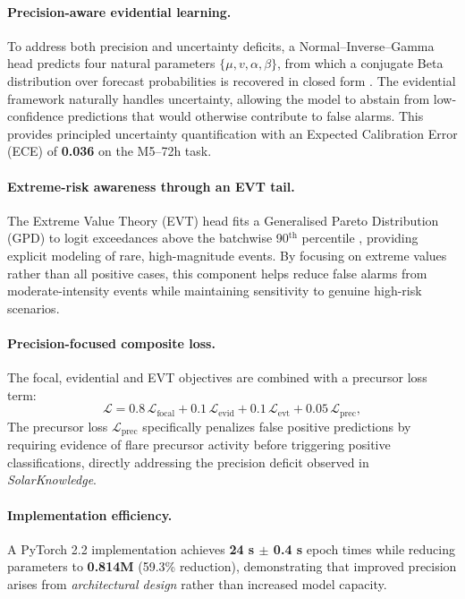 \paragraph{Precision-aware evidential learning.}
To address both precision and uncertainty deficits, a Normal–Inverse–Gamma head predicts four natural parameters $\{\mu,v,\alpha,\beta\}$, from which a conjugate Beta distribution over forecast probabilities is recovered in closed form \citep{sensoy2018evidential}. The evidential framework naturally handles uncertainty, allowing the model to abstain from low-confidence predictions that would otherwise contribute to false alarms. This provides principled uncertainty quantification with an Expected Calibration Error (ECE) of \textbf{0.036} on the M5–72h task.

\paragraph{Extreme-risk awareness through an EVT tail.}
The Extreme Value Theory (EVT) head fits a Generalised Pareto Distribution (GPD) to logit exceedances above the batchwise 90$^{\mathrm{th}}$ percentile \citep{coles2001extremes}, providing explicit modeling of rare, high-magnitude events. By focusing on extreme values rather than all positive cases, this component helps reduce false alarms from moderate-intensity events while maintaining sensitivity to genuine high-risk scenarios.

\paragraph{Precision-focused composite loss.}
The focal, evidential and EVT objectives are combined with a precursor loss term:
\[
  \mathcal{L}=0.8\,\mathcal{L}_{\text{focal}}
             +0.1\,\mathcal{L}_{\text{evid}}
             +0.1\,\mathcal{L}_{\text{evt}}
             +0.05\,\mathcal{L}_{\text{prec}},
\]
The precursor loss $\mathcal{L}_{\text{prec}}$ specifically penalizes false positive predictions by requiring evidence of flare precursor activity before triggering positive classifications, directly addressing the precision deficit observed in \textit{SolarKnowledge}.

\paragraph{Implementation efficiency.}
A PyTorch 2.2 implementation achieves \textbf{24 s $\pm$ 0.4 s} epoch times while reducing parameters to \textbf{0.814M} (59.3\% reduction), demonstrating that improved precision arises from \emph{architectural design} rather than increased model capacity.

